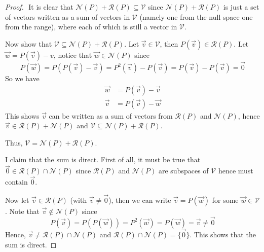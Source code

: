 \documentclass{article}
\begin{document}
\begin{proof}
$ $\newline
It is clear that $\mathcal{N}(P) + \mathcal{R}(P) \subseteq \mathcal{V}$ since $\mathcal{N}(P) + \mathcal{R}(P)$ is just a set of vectors written as a sum of vectors in $\mathcal{V}$ (namely one from the null space one from the range), where each of which is still a vector in $\mathcal{V}$. 

Now show that $\mathcal{V} \subseteq \mathcal{N}(P) + \mathcal{R}(P)$. Let $\vec{v} \in \mathcal{V}$, then $P(\vec{v}) \in \mathcal{R}(P)$. Let $\vec{w}= P(\vec{v}) - v$, notice that $\vec{w} \in \mathcal{N}(P)$ since $$P(\vec{w}) = P( P(\vec{v}) - \vec{v}) = P^2(\vec{v}) - P(\vec{v}) = P(\vec{v}) - P(\vec{v}) = \vec{0}$$ So we have 
\begin{align*}
\vec{w} &= P(\vec{v}) - \vec{v} \\
\vec{v} &= P(\vec{v}) - \vec{w}
\end{align*}
This shows $\vec{v}$ can be written as a sum of vectors from $\mathcal{R}(P)$ and $\mathcal{N}(P)$, hence $\vec{v} \in \mathcal{R}(P) + \mathcal{N}(P)$ and $\mathcal{V} \subseteq \mathcal{N}(P) + \mathcal{R}(P)$. 

Thus, $\mathcal{V} = \mathcal{N}(P) + \mathcal{R}(P)$.
\bigskip

I claim that the sum is direct. First of all, it must be true that $\vec{0} \in \mathcal{R}(P) \cap \mathcal{N}(P)$ since $\mathcal{R}(P)$ and $\mathcal{N}(P)$ are subspaces of $\mathcal{V}$ hence must contain $\vec{0}$.

Now let $\vec{v} \in \mathcal{R}(P)$ (with $\vec{v} \ne \vec{0}$), then we can write $\vec{v} = P(\vec{w})$ for some $\vec{w} \in \mathcal{V}$.
Note that $\vec{v} \notin \mathcal{N}(P)$ since $$P(\vec{v}) = P(P(\vec{w})) = P^2(\vec{w}) = P(\vec{w}) = \vec{v} \ne \vec{0}$$ Hence, $\vec{v} \ne \mathcal{R}(P) \cap \mathcal{N}(P)$ and $\mathcal{R}(P) \cap \mathcal{N}(P) = \{ \vec{0} \}$. This shows that the sum is direct.
\end{proof}
\end{document}
